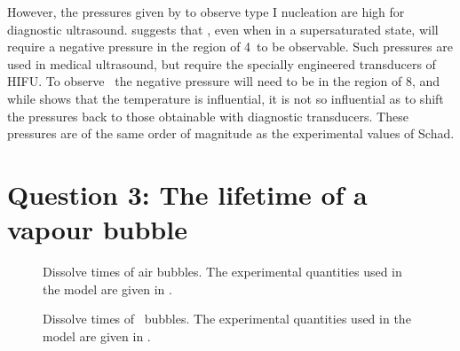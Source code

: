 However, the pressures given by   to observe type I nucleation are high for diagnostic ultrasound.
 suggests that  \pfb, even when in a supersaturated state,
will  require a negative pressure in the region of \unit{4}\mega\pascal\ to be observable. 
Such pressures are used in medical ultrasound, but require the specially engineered transducers of HIFU.
To observe \pfp\ the negative pressure will need to be in the region of \unit{8}\mega\pascal,
and while  shows that the temperature is influential, 
it is not so influential as to shift the pressures back to those obtainable with diagnostic transducers.
These pressures are of the same order of magnitude as the experimental values of Schad\cite{Schad2009}.




\section{Question 3: The lifetime of a vapour bubble}\label{sec:nuc:lifetime}


\begin{figure}
  \hspace*{-20mm}
  \subfloat[Dissolution of a \unit{1}\micro\metre\ air bubble when $\zeta=0$]{ \label{fig:nuc:dissolve_time_lum}}
  \caption{ Dissolve times of air bubbles.  The experimental quantities used in the model are given in .}
\end{figure}

\begin{figure}
  \hspace*{-20mm}
  \subfloat[Dissolution of a \unit{1}\micro\metre\ \pfp\ bubble when $\zeta=0$]{\label{fig:nuc:dissolve_time_lumPFP}}
  \caption{ Dissolve times of \pfp\ bubbles.  The experimental quantities used in the model are given in . }
 \label{fig:nuc:dissolve_time_lum}
\end{figure}

